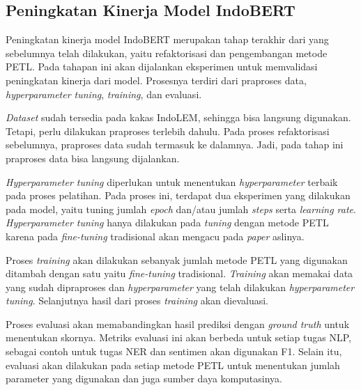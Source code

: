 \subsection{Peningkatan Kinerja Model IndoBERT}

Peningkatan kinerja model IndoBERT merupakan tahap terakhir dari yang sebelumnya telah dilakukan, yaitu refaktorisasi dan pengembangan metode PETL. Pada tahapan ini akan dijalankan eksperimen untuk memvalidasi peningkatan kinerja dari model. Prosesnya terdiri dari praproses data, \textit{hyperparameter tuning}, \textit{training}, dan evaluasi. 

\textit{Dataset} sudah tersedia pada kakas IndoLEM, sehingga bisa langsung digunakan. Tetapi, perlu dilakukan praproses terlebih dahulu. Pada proses refaktorisasi sebelumnya, praproses data sudah termasuk ke dalamnya. Jadi, pada tahap ini praproses data bisa langsung dijalankan.

\textit{Hyperparameter tuning} diperlukan untuk menentukan \textit{hyperparameter} terbaik pada proses pelatihan. Pada proses ini, terdapat dua eksperimen yang dilakukan pada model, yaitu tuning jumlah \textit{epoch} dan/atau jumlah \textit{steps} serta \textit{learning rate}. \textit{Hyperparameter tuning} hanya dilakukan pada \textit{tuning} dengan metode PETL karena pada \textit{fine-tuning} tradisional akan mengacu pada \textit{paper} aslinya.

Proses \textit{training} akan dilakukan sebanyak jumlah metode PETL yang digunakan ditambah dengan satu yaitu \textit{fine-tuning} tradisional. \textit{Training} akan memakai data yang sudah dipraproses dan \textit{hyperparameter} yang telah dilakukan \textit{hyperparameter tuning}. Selanjutnya hasil dari proses \textit{training} akan dievaluasi.

Proses evaluasi akan memabandingkan hasil prediksi dengan \textit{ground truth} untuk menentukan skornya. Metriks evaluasi ini akan berbeda untuk setiap tugas NLP, sebagai contoh untuk tugas NER dan sentimen akan digunakan F1. Selain itu, evaluasi akan dilakukan pada setiap metode PETL untuk menentukan jumlah parameter yang digunakan dan juga sumber daya komputasinya. 